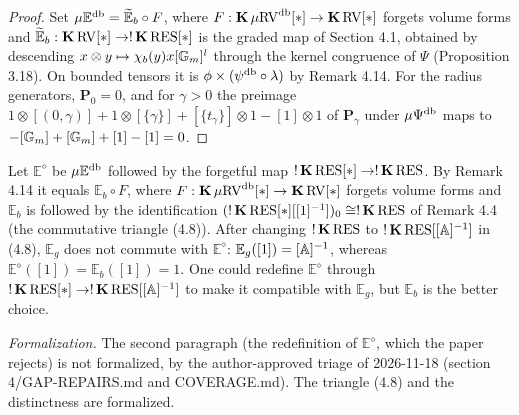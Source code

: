\begin{proof}
\leanok
Set $\mu\mathbb{E}^{\operatorname{db}} = \widetilde{\mathbb{E}}_b \circ F$, where $F : \operatorname{\mathbf{K}} \mu\mathrm{RV}^{\operatorname{db}}[*] \to \operatorname{\mathbf{K}} \mathrm{RV}[*]$ forgets volume forms and $\widetilde{\mathbb{E}}_b : \operatorname{\mathbf{K}} \mathrm{RV}[*] \to !\operatorname{\mathbf{K}} \mathrm{RES}[*]$ is the graded map of Section 4.1, obtained by descending $x \otimes y \mapsto \chi_b(y) x [\mathbb{G}_m]^l$ through the kernel congruence of $\Psi$ (Proposition 3.18). On bounded tensors it is $\phi \times (\psi^{\operatorname{db}} \circ \lambda)$ by Remark 4.14. For the radius generators, $\mathbf{P}_0 = 0$, and for $\gamma > 0$ the preimage $1 \otimes [(0, \gamma)] + 1 \otimes [\{\gamma\}] + [\{t_\gamma\}] \otimes 1 - [1] \otimes 1$ of $\mathbf{P}_\gamma$ under $\mu\Psi^{\operatorname{db}}$ maps to $-[\mathbb{G}_m] + [\mathbb{G}_m] + [1] - [1] = 0$.
\end{proof}

\setcounter{theorem}{15}
\begin{remark}
\label{eb-not-eg}
\leanok
{}
Let $\mathbb{E}^\diamond$ be $\mu\mathbb{E}^{\operatorname{db}}$ followed by the forgetful map $!\operatorname{\mathbf{K}} \mathrm{RES}[*] \to !\operatorname{\mathbf{K}} \mathrm{RES}$. By Remark 4.14 it equals $\mathbb{E}_b \circ F$, where $F : \operatorname{\mathbf{K}} \mu\mathrm{RV}^{\operatorname{db}}[*] \to \operatorname{\mathbf{K}} \mathrm{RV}[*]$ forgets volume forms and $\mathbb{E}_b$ is followed by the identification $(!\operatorname{\mathbf{K}} \mathrm{RES}[*][[1]^{-1}])_0 \cong !\operatorname{\mathbf{K}} \mathrm{RES}$ of Remark 4.4 (the commutative triangle (4.8)). After changing $!\operatorname{\mathbf{K}} \mathrm{RES}$ to $!\operatorname{\mathbf{K}} \mathrm{RES}[[\mathbb{A}]^{-1}]$ in (4.8), $\mathbb{E}_g$ does not commute with $\mathbb{E}^\diamond$: $\mathbb{E}_g([1]) = [\mathbb{A}]^{-1}$, whereas $\mathbb{E}^\diamond([1]) = \mathbb{E}_b([1]) = 1$. One could redefine $\mathbb{E}^\diamond$ through $!\operatorname{\mathbf{K}} \mathrm{RES}[*] \to !\operatorname{\mathbf{K}} \mathrm{RES}[[\mathbb{A}]^{-1}]$ to make it compatible with $\mathbb{E}_g$, but $\mathbb{E}_b$ is the better choice.

\emph{Formalization.} The second paragraph (the redefinition of $\mathbb{E}^\diamond$, which the paper rejects) is not formalized, by the author-approved triage of 2026-11-18 (section 4/GAP-REPAIRS.md and COVERAGE.md). The triangle (4.8) and the distinctness are formalized.
\end{remark}

